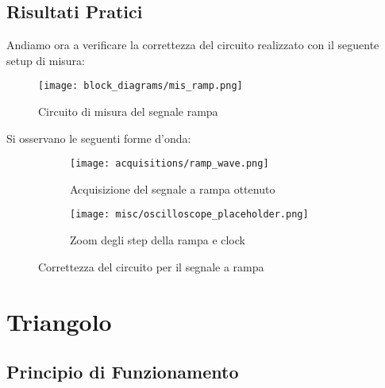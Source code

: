 
\subsection*{Risultati Pratici}


Andiamo ora a verificare la correttezza del circuito realizzato con il seguente setup di
misura:

\begin{figure}[H]
    \centering
    \texttt{[image: block\_diagrams/mis\_ramp.png]}
    \caption{Circuito di misura del segnale rampa}
    \label{mis_ramp}
\end{figure}

\vspace{2cm}

Si osservano le seguenti forme d'onda:

\begin{figure}[H]
    \centering

    \begin{subfigure}{.5\textwidth}
        \centering
        \texttt{[image: acquisitions/ramp\_wave.png]}
        \caption{Acquisizione del segnale a rampa ottenuto}
        \label{acq_ramp}
    \end{subfigure}%
    \begin{subfigure}{.5\textwidth}
        \centering
        \texttt{[image: misc/oscilloscope\_placeholder.png]}
        \caption{Zoom degli step della rampa e clock}
        \label{acq_ramp_steps}
    \end{subfigure}

    \caption{Correttezza del circuito per il segnale a rampa}
    \label{acq_ramp_signals}
\end{figure}


\section{Triangolo}


\subsection*{Principio di Funzionamento}

